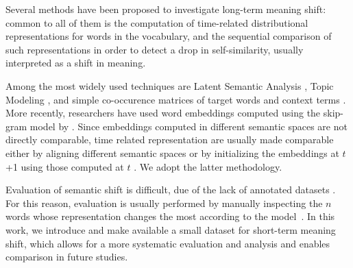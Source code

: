 Several methods have been proposed to investigate long-term
meaning shift: common to all of them is the computation of
time-related distributional representations for words in the
vocabulary, and the sequential comparison of such representations in
order to detect a drop in self-similarity, usually
interpreted as a shift in meaning.

Among the most widely used techniques are Latent Semantic Analysis
\cite{sagi2011tracing,jatowt2014framework}, Topic Modeling
\cite{wijaya2011understanding,rohrdantz2011towards}, and simple
co-occurence matrices of target words and context terms 
\cite{gulordava2011distributional,xu2015computational}.
More recently, researchers have used word embeddings computed using the skip-gram model by . Since embeddings computed in different semantic
spaces are not directly comparable, time related representation are usually made comparable either by aligning different semantic spaces 
\cite{kulkarni2015statistically,azarbonyad2017words, hamilton2016diachronic} or by initializing the embeddings at $t$+1 using those computed at $t$ \cite{kim2014temporal, del2016tracing,phillips2017intrinsic,szymanski2017temporal}. We adopt the latter methodology.

Evaluation of semantic shift is difficult, due of the lack of annotated datasets \cite{frermann2016bayesian}. For this reason, evaluation is usually performed 
 by manually inspecting the $n$ words whose representation changes the most according to the model~\cite{hamilton2016diachronic,del2016tracing,kim2014temporal}. 
In this work, we introduce and make available a small dataset for
short-term meaning shift, which
allows for a more systematic evaluation and analysis and enables comparison in future studies.

